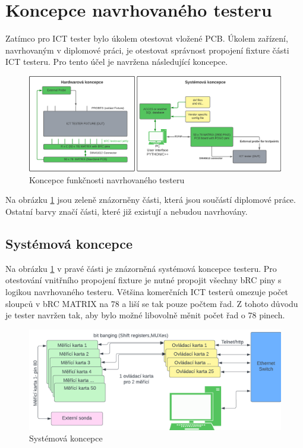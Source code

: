 \section{Koncepce navrhovaného testeru}
Zatímco pro ICT tester bylo úkolem otestovat vložené PCB. Úkolem zařízení, navrhovaným v diplomové práci, je otestovat správnost propojení
fixture části ICT testeru. Pro tento účel je navržena následující koncepce.
\begin{figure}[ht!]
        \centering
        \includegraphics[width = 1\textwidth]{obrazky/system_connection_and_fixture.png}
        \caption{Koncepce funkčnosti navrhovaného testeru}
        \label{fig:Koncepce funkce}
    \end{figure}

    Na obrázku \ref{fig:Koncepce funkce} jsou zeleně znázorněny části, která jsou součástí diplomové práce.
    Ostatní barvy značí části, které již existují a nebudou navrhovány.
    \subsection{Systémová koncepce}
    Na obrázku \ref{fig:Koncepce funkce} v pravé části je znázorněná systémová koncepce testeru.
    Pro otestování vnitřního propojení fixture je nutné propojit všechny bRC piny s logikou navrhovaného testeru.
    Většina komerčních ICT testerů omezuje počet sloupců v bRC MATRIX na 78 a liší se tak pouze počtem řad.
    Z tohoto důvodu je tester navržen tak, aby bylo možné libovolně  měnit počet řad o 78 pinech\cite{ICT_guidline}.\\
    
    \begin{figure}[ht!]
        \centering
        \includegraphics[width = 1\textwidth]{obrazky/telnet_http_pc.png}
        \caption{Systémová koncepce}
        \label{fig:Systémová koncepce}
    \end{figure}

